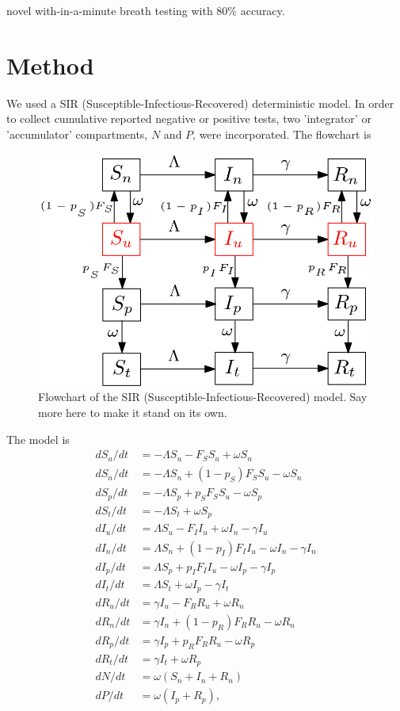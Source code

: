 \documentclass{article}
\theoremstyle{definition} %
\begin{document}
\citep{ruszkiewicz2020diagnosis} novel with-in-a-minute breath testing with 80\% accuracy. 

\section{Method}

We used a SIR (Susceptible-Infectious-Recovered) deterministic model. In order to collect cumulative reported negative or positive tests, two 'integrator' or 'accumulator' compartments, $N$ and $P$, were incorporated. The flowchart is 

\begin{figure}[!h] 
\begin{center} 
\includegraphics[scale=0.3]{./pix/sir_comp.png}
\caption{\small Flowchart of the SIR (Susceptible-Infectious-Recovered) model. Say more here to make it stand on its own.
\label{fig:flowchart}} 
\end{center} 
\end{figure}

The model is
\begin{align}
\label{model}
 d S_u/dt &= -\Lambda S_u - F_S S_u + \omega S_n \\
 d S_n/dt &= -\Lambda S_n + (1-p_S) F_S S_u - \omega S_n \\
 d S_p/dt &= -\Lambda S_p + p_S F_S S_u - \omega S_p \\
 d S_t/dt &= -\Lambda S_t + \omega S_p \\
 d I_u/dt &= \Lambda S_u - F_I I_u + \omega I_n  - \gamma I_u  \\
 d I_n/dt &= \Lambda S_n + (1-p_I) F_I I_u - \omega I_n -\gamma I_n \\
 d I_p/dt &= \Lambda S_p + p_I F_I I_u - \omega I_p -\gamma I_p \\
 d I_t/dt &= \Lambda S_t + \omega I_p - \gamma I_t  \\
 d R_u/dt &= \gamma I_u - F_R R_u + \omega R_n \\
 d R_n/dt &= \gamma I_n + (1-p_R) F_R R_u - \omega R_n  \\
 d R_p/dt &= \gamma I_p + p_R F_R R_u  - \omega R_p  \\
 d R_t/dt&= \gamma I_t + \omega R_p  \\
 dN/dt &= \omega (S_n + I_n + R_n)   \\
 dP/dt &= \omega(I_p + R_p),
\end{align}
\end{document}
